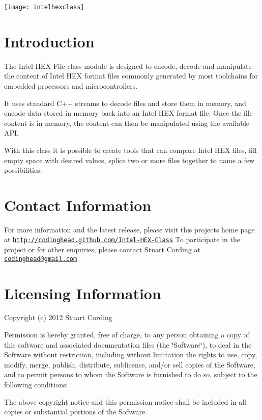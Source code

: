  
\begin{DoxyImageNoCaption}
  \mbox{\texttt{[image: intelhexclass]}}
\end{DoxyImageNoCaption}
 \hypertarget{index_intro}{}\section{Introduction}\label{index_intro}
The Intel H\-E\-X File class module is designed to encode, decode and manipulate the content of Intel H\-E\-X format files commonly generated by most toolchains for embedded processors and microcontrollers.

It uses standard C++ streams to decode files and store them in memory, and encode data stored in memory back into an Intel H\-E\-X format file. Once the file content is in memory, the content can then be manipulated using the available A\-P\-I.

With this class it is possible to create tools that can compare Intel H\-E\-X files, fill empty space with desired values, splice two or more files together to name a few possibilities.\hypertarget{index_contactInfo}{}\section{Contact Information}\label{index_contactInfo}
For more information and the latest release, please visit this projects home page at \href{http://codinghead.github.com/Intel-HEX-Class}{\tt http\-://codinghead.\-github.\-com/\-Intel-\/\-H\-E\-X-\/\-Class} To participate in the project or for other enquiries, please contact Stuart Cording at \href{mailto:codinghead@gmail.com}{\tt codinghead@gmail.\-com}\hypertarget{index_license}{}\section{Licensing Information}\label{index_license}
Copyright (c) 2012 Stuart Cording

Permission is hereby granted, free of charge, to any person obtaining a copy of this software and associated documentation files (the \char`\"{}\-Software\char`\"{}), to deal in the Software without restriction, including without limitation the rights to use, copy, modify, merge, publish, distribute, sublicense, and/or sell copies of the Software, and to permit persons to whom the Software is furnished to do so, subject to the following conditions\-:

The above copyright notice and this permission notice shall be included in all copies or substantial portions of the Software.

